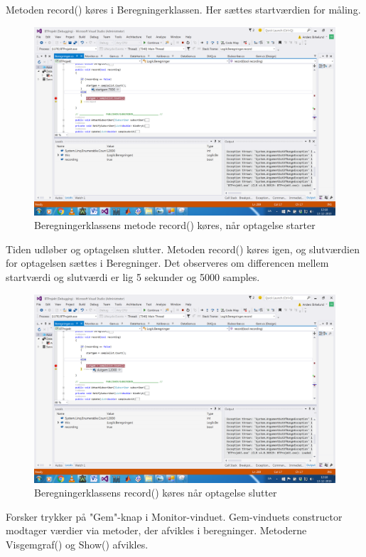 Metoden record() køres i Beregningerklassen. Her sættes startværdien for måling.

\begin{figure}[H]
	\centering
	\includegraphics[width=1\textwidth]{Figurer/UC6_Record_Start}
	\caption{Beregningerklassens metode record() køres, når optagelse starter}
\end{figure}

Tiden udløber og optagelsen slutter. Metoden record() køres igen, og slutværdien for optagelsen sættes i Beregninger. Det observeres om differencen mellem startværdi og slutværdi er lig 5 sekunder og 5000 samples.

\begin{figure}[H]
	\centering
	\includegraphics[width=1\textwidth]{Figurer/UC6_Record_Slut}
	\caption{Beregningerklassens record() køres når optagelse slutter}
\end{figure}

Forsker trykker på "Gem"\--knap i Monitor-vinduet. Gem-vinduets constructor modtager værdier via metoder, der afvikles i beregninger. Metoderne Visgemgraf() og Show() afvikles.

